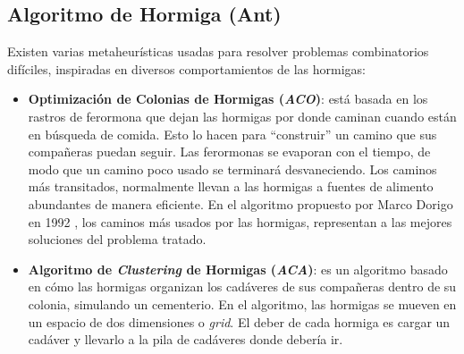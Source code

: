 \subsection{Algoritmo de Hormiga (Ant)}
\label{sect:metaant}

    Existen varias metaheurísticas usadas para resolver problemas combinatorios
difíciles, ins\-pi\-ra\-das en diversos comportamientos de las hormigas:
\begin{itemize}
    \item \textbf{Optimización de Colonias de Hormigas (\emph{ACO})}: está basada
en los rastros de fer\-or\-mo\-na que dejan las hormigas por donde caminan cuando
están en búsqueda de comida. Esto lo hacen para ``construir'' un camino que sus
compañeras puedan seguir. Las ferormonas se evaporan con el tiempo, de modo que
un camino poco usado se terminará desvaneciendo. Los caminos más transitados,
normalmente llevan a las hormigas a fuentes de alimento abundantes de manera
eficiente. En el algoritmo propuesto por Marco Dorigo en 1992 \cite{Ant_0}, los
caminos más usados por las hormigas, representan a las mejores soluciones del
problema tratado.
    \item \textbf{Algoritmo de \emph{Clustering} de Hormigas (\emph{ACA})}\cite{OuBa2007}: es
un algoritmo basado en cómo las hormigas organizan los cadáveres de sus
compañeras dentro de su colonia, simulando un cementerio. En el algoritmo, las
hormigas se mueven en un espacio de dos dimensiones o \emph{grid}. El deber de
cada hormiga es cargar un cadáver y llevarlo a la pila de cadáveres donde
debería ir.
\end{itemize}

